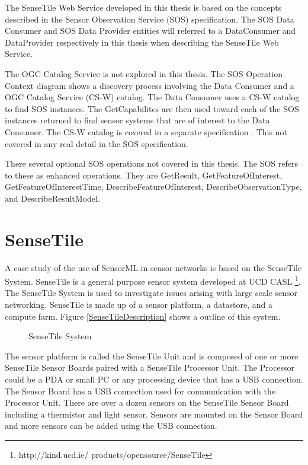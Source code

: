 \documentclass[]{final_report}
\begin{document}
The SenseTile Web Service developed in this thesis is based on the concepts described in the Sensor Observation Service (SOS) specification. The SOS Data Consumer and SOS Data Provider entities will referred to a DataConsumer and DataProvider respectively in this thesis when describing the SenseTile Web Service.
 
The OGC Catalog Service is not explored in this thesis. The SOS Operation Context diagram shows a discovery process involving the  Data Consumer and a OGC Catalog Service (CS-W) catalog. The Data Consumer uses a CS-W catalog to find SOS instances. The GetCapabilites are then used toward each of the SOS instances returned to find sensor systems that are of interest to the Data Consumer. The CS-W catalog is covered in a separate specification \cite{OGCcatref}. This not covered in any real detail in the SOS specification. 

There several optional SOS operations not covered in this thesis. The SOS refers to these as enhanced operations. They are GetResult,
GetFeatureOfInterest, GetFeatureOfInterestTime, DescribeFeatureOfInterest, DescribeObservationType, and DescribeResultModel. 


\section{SenseTile}
A case study of the use of SensorML in sensor networks is based on the SenseTile System. SenseTile is a general purpose sensor system developed at UCD CASL \footnote{http://kind.ucd.ie/
products/opensource/SenseTile}. The SenseTile System is used to investigate issues arising with large scale sensor networking. SenseTile is made up of a sensor platform, a datastore, and a compute farm. Figure \ref{SenseTileDescription} shows a outline of this system. 
\begin{figure}[h]
\centering
{}
\caption{SenseTile System}\label{fig:SenseTileDescription}
\end{figure}
 The sensor platform is called the SenseTile Unit and is composed of one or more SenseTile Sensor Boards paired with a SenseTile Processor Unit. The Processor could be a PDA or small PC or any processing device that has a USB connection.  The Sensor Board has a USB connection used for communication with the Processor Unit. There are over a dozen sensors on the SenseTile Sensor Board including a thermistor and light sensor. Sensors are mounted on the Sensor Board and more sensors can be added using the USB connection.
\end{document}
